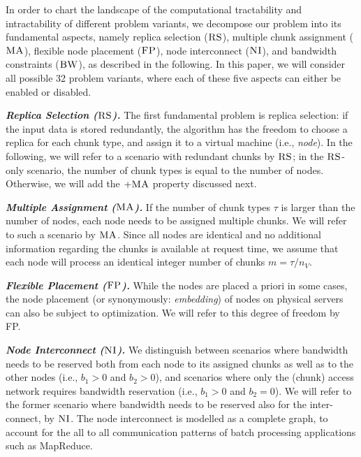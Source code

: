 \documentclass[conference,10pt]{IEEEtran}
\newcommand{\MaFactor}{m}
\newcommand{\capa}{\emph{cap}}
\newcommand{\CC}{\textsc{NI}}
\newcommand{\FP}{\textsc{FP}}
\newcommand{\RS}{\textsc{RS}}
\newcommand{\BW}{\textsc{BW}}
\newcommand{\MA}{\textsc{MA}}
\newcommand{\CostTrans}{\ensuremath{b_1}}
\newcommand{\CostCom}{\ensuremath{b_2}}
\begin{document}
In order to chart the landscape of the computational tractability and intractability of different
problem variants, we decompose our problem into its fundamental aspects, namely replica selection
($\RS$), multiple chunk assignment ($\MA$), flexible node placement ($\FP$), node interconnect ($\CC$),
and bandwidth constraints ($\BW$), as described in the following. 
In this paper, we will consider all possible 32 problem variants, where each of these five aspects
can either be enabled or disabled. 

\textbf{\emph{Replica Selection ($\RS$).}} The first fundamental problem is replica selection:
if the input data is stored redundantly, the algorithm has the freedom to choose a replica
for each chunk type, and assign it to a virtual machine (i.e., \emph{node}).
In the following, we will refer to a scenario
with redundant chunks by $\RS$; in the $\RS$-only scenario, the number of chunk types
is equal to the number of nodes. Otherwise, we will add the $+\MA$ property discussed next.

\textbf{\emph{Multiple Assignment ($\MA$).}}
If the number of chunk types $\tau$ is larger than the number of nodes,
each node needs to be assigned multiple chunks. We will refer to such a scenario by $\MA$. 
Since all nodes are identical and no additional information regarding the chunks is available at request time, we assume that each node will process an identical integer number of chunks $\MaFactor = \tau / n_V$. 


\textbf{\emph{Flexible Placement ($\FP$).}} %
While the nodes are placed a priori in some cases, the node placement (or
synonymously: \emph{embedding}) of nodes on physical servers can also be
subject to optimization. We will refer to this degree of freedom by FP.

\textbf{\emph{Node Interconnect ($\CC$).}} We distinguish between scenarios
where bandwidth needs to be reserved
both from each node to its assigned chunks as well as to the other nodes
(i.e., $\CostTrans>0$ and $\CostCom>0$), and
 scenarios where only the (chunk) access network requires bandwidth reservation (i.e., $\CostTrans>0$ and $\CostCom=0$).
 We will refer to the former scenario
where bandwidth needs to be reserved also for the inter-connect, by $\CC$. 
The node interconnect is modelled as a complete graph, to account for the all to all communication patterns of batch processing applications such as MapReduce.
\end{document}
